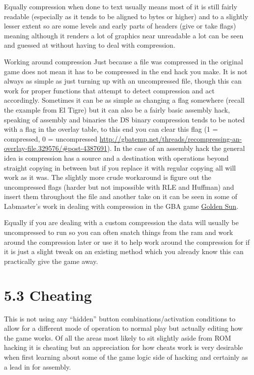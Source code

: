 \documentclass[
]{book}
\begin{document}
Equally compression when done to text usually means most of it is still fairly readable (especially as it tends to be aligned to bytes or higher) and to a slightly lesser extent so are some levels and early parts of headers (give or take flags) meaning although it renders a lot of graphics near unreadable a lot can be seen and guessed at without having to deal with compression.

Working around compression Just because a file was compressed in the original game does not mean it has to be compressed in the end hack you make. It is not always as simple as just turning up with an uncompressed file, though this can work for proper functions that attempt to detect compression and act accordingly. Sometimes it can be as simple as changing a flag somewhere (recall the example from El Tigre) but it can also be a fairly basic assembly hack, speaking of assembly and binaries the DS binary compression tends to be noted with a flag in the overlay table, to this end you can clear this flag (1 = compressed, 0 = uncompressed \url{http://gbatemp.net/threads/recompressing-an-overlay-file.329576/\#post-4387691}). In the case of an assembly hack the general idea is compression has a source and a destination with operations beyond straight copying in between but if you replace it with regular copying all will work as it was. The slightly more crude workaround is figure out the uncompressed flags (harder but not impossible with RLE and Huffman) and insert them throughout the file and another take on it can be seen in some of Labmaster's work in dealing with compression in the GBA game \href{http://www.romhacking.net/documents/253/}{Golden Sun}.

Equally if you are dealing with a custom compression the data will usually be uncompressed to run so you can often snatch things from the ram and work around the compression later or use it to help work around the compression for if it is just a slight tweak on an existing method which you already know this can practically give the game away.

\hypertarget{cheating}{%
\section{5.3 Cheating}\label{cheating}}

This is not using any ``hidden'' button combinations/activation conditions to allow for a different mode of operation to normal play but actually editing how the game works. Of all the areas most likely to sit slightly aside from ROM hacking it is cheating but an appreciation for how cheats work is very desirable when first learning about some of the game logic side of hacking and certainly as a lead in for assembly.
\end{document}

